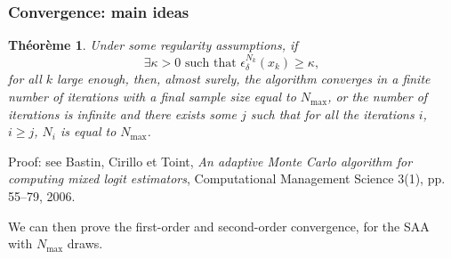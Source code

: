 \documentclass{beamer}
\newtheorem{theo}{Théorème}
\begin{document}
\begin{frame}
\frametitle{Convergence: main ideas}

\begin{theo}
Under some regularity assumptions, if
\[
\exists \kappa > 0\text{ such that }
\epsilon_{\delta}^{N_k}(x_k) \geq \kappa,
\]
for all $k$ large enough, then, almost surely, the algorithm converges in a finite number of iterations with a final sample size equal to $N_{\max}$, or the number of iterations is infinite and there exists some $j$ such that for all the iterations $i$, $i \geq j$, $N_i$ is equal to $N_{\max}$.
\end{theo}
Proof: see Bastin, Cirillo et Toint, {\sl An adaptive {Monte Carlo}
  algorithm for computing mixed logit estimators}, Computational
Management Science 3(1), pp. 55--79, 2006.

\mbox{}

We can then prove the first-order and second-order convergence, for the SAA with $N_{\max}$ draws.

\end{frame}
\end{document}
